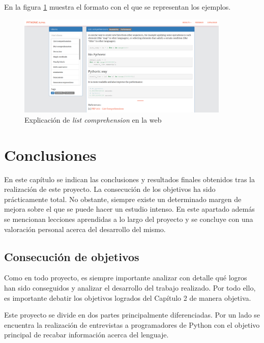 \documentclass[a4paper, 12pt]{book}
\begin{document}
En la figura \ref{fig:ejemploidiom} muestra el formato con el que se representan los ejemplos.
\begin{figure}[H]
    \centering
    \includegraphics[width=0.9\textwidth]{img/1idioms.png}
    \caption{Explicación de \textit{list comprehension} en la web}
    \label{fig:ejemploidiom}
\end{figure}


\cleardoublepage
\chapter{Conclusiones}
\label{chap:conclusiones}

En este capítulo se indican las conclusiones y resultados finales obtenidos tras la realización de este proyecto. La consecución de los objetivos ha sido prácticamente total. No obstante, siempre existe un determinado margen de mejora sobre el que se puede hacer un estudio intenso. En este apartado además se mencionan lecciones aprendidas a lo largo del proyecto y se concluye con una valoración personal acerca del desarrollo del mismo.

\section{Consecución de objetivos}
\label{sec:consecucion-objetivos}

Como en todo proyecto, es siempre importante analizar con detalle qué logros han sido conseguidos y analizar el desarrollo del trabajo realizado. Por todo ello, es importante debatir los objetivos logrados del Capítulo 2 de manera objetiva.

Este proyecto se divide en dos partes principalmente diferenciadas. Por un lado se encuentra la realización de entrevistas a programadores de Python con el objetivo principal de recabar información acerca del lenguaje.
\end{document}
